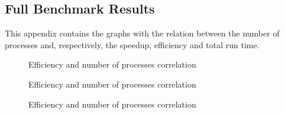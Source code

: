 \subsection{Full Benchmark Results}

This appendix contains the graphs with the relation between the number of processes and, respectively, the speedup, efficiency and total run time.

\begin{figure}[!ht]
    \centering
    
    
    
    
    \caption{Efficiency and number of processes correlation}
\end{figure}

\begin{figure}[!ht]
    \centering
    
    
    
    
    \caption{Efficiency and number of processes correlation}
\end{figure}

\begin{figure}[!ht]
    \centering
    
    
    
    
    \caption{Efficiency and number of processes correlation}
\end{figure}
